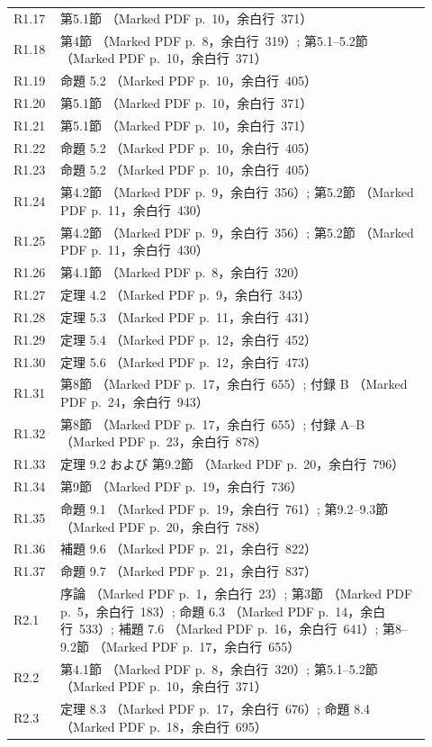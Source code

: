 \documentclass[10pt,a4paper]{ltjsarticle}
\begin{document}
\begin{longtable}{@{}p{0.09\linewidth}p{0.83\linewidth}@{}}
R1.17 & 第5.1節 （Marked PDF p.~10，余白行~371）\\
R1.18 & 第4節 （Marked PDF p.~8，余白行~319）; 第5.1--5.2節 （Marked PDF p.~10，余白行~371）\\
R1.19 & 命題 5.2 （Marked PDF p.~10，余白行~405）\\
R1.20 & 第5.1節 （Marked PDF p.~10，余白行~371）\\
R1.21 & 第5.1節 （Marked PDF p.~10，余白行~371）\\
R1.22 & 命題 5.2 （Marked PDF p.~10，余白行~405）\\
R1.23 & 命題 5.2 （Marked PDF p.~10，余白行~405）\\
R1.24 & 第4.2節 （Marked PDF p.~9，余白行~356）; 第5.2節 （Marked PDF p.~11，余白行~430）\\
R1.25 & 第4.2節 （Marked PDF p.~9，余白行~356）; 第5.2節 （Marked PDF p.~11，余白行~430）\\
R1.26 & 第4.1節 （Marked PDF p.~8，余白行~320）\\
R1.27 & 定理 4.2 （Marked PDF p.~9，余白行~343）\\
R1.28 & 定理 5.3 （Marked PDF p.~11，余白行~431）\\
R1.29 & 定理 5.4 （Marked PDF p.~12，余白行~452）\\
R1.30 & 定理 5.6 （Marked PDF p.~12，余白行~473）\\
R1.31 & 第8節 （Marked PDF p.~17，余白行~655）; 付録 B （Marked PDF p.~24，余白行~943）\\
R1.32 & 第8節 （Marked PDF p.~17，余白行~655）; 付録 A--B （Marked PDF p.~23，余白行~878）\\
R1.33 & 定理 9.2 および 第9.2節 （Marked PDF p.~20，余白行~796）\\
R1.34 & 第9節 （Marked PDF p.~19，余白行~736）\\
R1.35 & 命題 9.1 （Marked PDF p.~19，余白行~761）; 第9.2--9.3節 （Marked PDF p.~20，余白行~788）\\
R1.36 & 補題 9.6 （Marked PDF p.~21，余白行~822）\\
R1.37 & 命題 9.7 （Marked PDF p.~21，余白行~837）\\
R2.1 & 序論 （Marked PDF p.~1，余白行~23）; 第3節 （Marked PDF p.~5，余白行~183）; 命題 6.3 （Marked PDF p.~14，余白行~533）; 補題 7.6 （Marked PDF p.~16，余白行~641）; 第8--9.2節 （Marked PDF p.~17，余白行~655）\\
R2.2 & 第4.1節 （Marked PDF p.~8，余白行~320）; 第5.1--5.2節 （Marked PDF p.~10，余白行~371）\\
R2.3 & 定理 8.3 （Marked PDF p.~17，余白行~676）; 命題 8.4 （Marked PDF p.~18，余白行~695）\\

\end{longtable}
\end{document}
